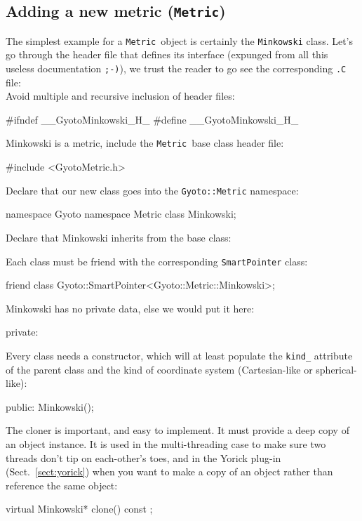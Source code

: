 \documentclass[a4paper,12pt]{article}
\newcommand{\Metric}{\texttt{Metric}}
\begin{document}
\subsection{Adding a new metric (\Metric)}

The simplest example for a \Metric\ object is certainly the
\texttt{Minkowski} class. Let's go through the header file that
defines its interface (expunged from all this useless documentation
\texttt{;-)}), we trust the reader to go see the corresponding
\texttt{.C} file:\\
Avoid multiple and recursive inclusion of header files:
\begin{code}
  #ifndef __GyotoMinkowski_H_
  #define __GyotoMinkowski_H_
\end{code}
Minkowski is a metric, include the \Metric\ base class header file:
\begin{code}
  #include <GyotoMetric.h>
\end{code}
Declare that our new class goes into the \texttt{Gyoto::Metric}
namespace:
\begin{code}
  namespace Gyoto {
    namespace Metric { class Minkowski; }
  }
\end{code}
Declare that Minkowski inherits from the base class:
\begin{code}
  class Gyoto::Metric::Minkowski
  : public Gyoto::Metric::Generic
  {
\end{code}
Each class must be friend with the corresponding \texttt{SmartPointer}
class:
\begin{code}
    friend class Gyoto::SmartPointer<Gyoto::Metric::Minkowski>;
\end{code}
Minkowski has no private data, else we would put it here:
\begin{code}
    private:

\end{code}
Every class needs a constructor, which will at least populate the
\texttt{kind\_} attribute of the parent class and the kind of coordinate
system (Cartesian-like or spherical-like):
\begin{code}
  public:
    Minkowski();
\end{code}
The cloner is important, and easy to implement. It must provide a deep
copy of an object instance. It is used in the multi-threading case to
make sure two threads don't tip on each-other's toes, and in the
Yorick plug-in (Sect.~\ref{sect:yorick}) when you want to make a copy
of an object rather than reference the same object:
\begin{code}
    virtual Minkowski* clone() const ;
\end{code}
\end{document}
